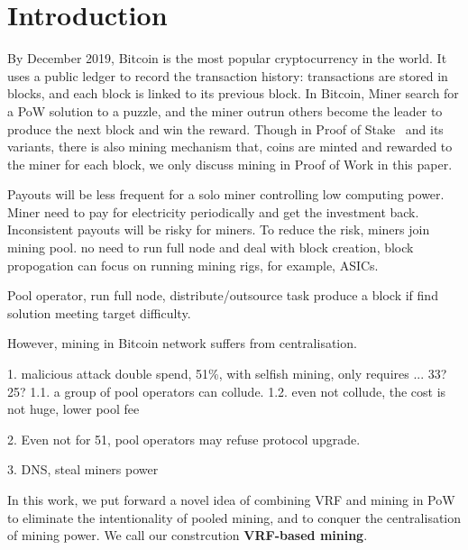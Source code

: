 \section{Introduction}

By December 2019, Bitcoin is the most popular cryptocurrency in the world.
It uses a public ledger to record the transaction history: transactions are stored in blocks, and each block is linked to its previous block.
In Bitcoin, Miner search for a PoW solution to a puzzle, and the miner outrun others become the leader to produce the next block and win the reward.
Though in Proof of Stake~\cite{} and its variants, there is also mining mechanism that, coins are minted and rewarded to the miner for each block, we only discuss mining in Proof of Work in this paper.


Payouts will be less frequent for a solo miner controlling low computing power. Miner need to pay for electricity periodically and get the investment back.
Inconsistent payouts will be risky for miners.
To reduce the risk, miners join mining pool.
no need to run full node and deal with block creation, block propogation
can focus on running mining rigs, for example, ASICs.

Pool operator, run full node, distribute/outsource task
produce a block if find solution meeting target difficulty.

However, mining in Bitcoin network suffers from centralisation.




1. malicious attack
double spend, 51\%, with selfish mining, only requires ... 33?25?
1.1. a group of pool operators can collude.
1.2. even not collude, the cost is not huge, lower pool fee

2. Even not for 51, 
pool operators may refuse protocol upgrade. 


3. DNS, steal miners power


In this work, we put forward a novel idea of combining VRF and mining in PoW to eliminate the intentionality of pooled mining, and to conquer the centralisation of mining power. We call our constrcution \textbf{VRF-based mining}.